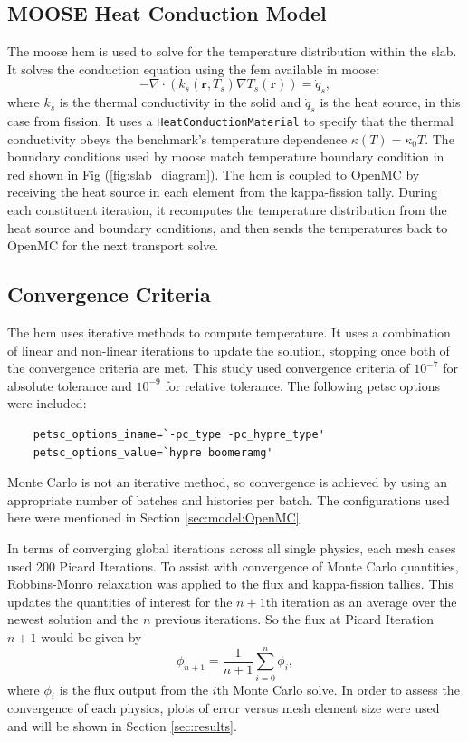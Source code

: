 \documentclass[letterpaper]{mc2023}
\begin{document}
\subsection{MOOSE Heat Conduction Model}
The \gls{moose} \gls{hcm} is used to solve for the temperature distribution within the slab. It solves the conduction equation using the
\gls{fem} available in \gls{moose}:
\begin{equation}\label{eq:conduction}
    - \nabla \cdot (k_{s}(\mathbf{r},T_{s}) \nabla T_{s}(\mathbf{r})) = \dot{q}_{s},
\end{equation}
where $k_{s}$ is the thermal conductivity in the solid and $\dot{q}_{s}$ is the heat source, in this case from fission. It uses a
\texttt{HeatConductionMaterial} to specify that the thermal conductivity obeys the benchmark's temperature dependence $\kappa(T)=\kappa_{0}T$.
The boundary conditions used by \gls{moose} match temperature boundary condition in red shown in Fig (\ref{fig:slab_diagram}). The
\gls{hcm} is coupled to OpenMC by receiving the heat source in each element from the kappa-fission tally. During each constituent
iteration, it recomputes the temperature distribution from the heat source and boundary conditions, and then sends the temperatures
back to OpenMC for the next transport solve.

\subsection{Convergence Criteria}
The \gls{hcm} uses iterative methods to compute temperature. It uses a combination of linear and non-linear iterations to update the
solution, stopping once both of the convergence criteria are met. This study used convergence criteria of $10^{-7}$ for absolute tolerance
and $10^{-9}$ for relative tolerance.  The following petsc options were included:
\begin{lstlisting}
    petsc_options_iname=`-pc_type -pc_hypre_type'
    petsc_options_value=`hypre boomeramg'
\end{lstlisting}
Monte Carlo is not an iterative method, so convergence is achieved by using an
appropriate number of batches and histories per batch. The configurations used here were mentioned in Section \ref{sec:model:OpenMC}.

In terms of converging global iterations across all single physics, each mesh cases used 200 Picard Iterations. To assist with
convergence of Monte Carlo quantities, Robbins-Monro relaxation was applied to the flux and kappa-fission tallies. This updates the
quantities of interest for the $n+1$th iteration as an average over the newest solution and the $n$ previous iterations. \cite{omccap}
So the flux at Picard Iteration $n+1$ would be given by
\begin{equation}\label{eq:Robbins-Monro}
    \phi_{n+1} = \frac{1}{n+1} \sum_{i=0}^{n} \phi_{i},
\end{equation}
where $\phi_{i}$ is the flux output from the $i$th Monte Carlo solve. In order to assess the convergence of each physics, plots of
error versus mesh element size were used and will be shown in Section \ref{sec:results}.
\end{document}
